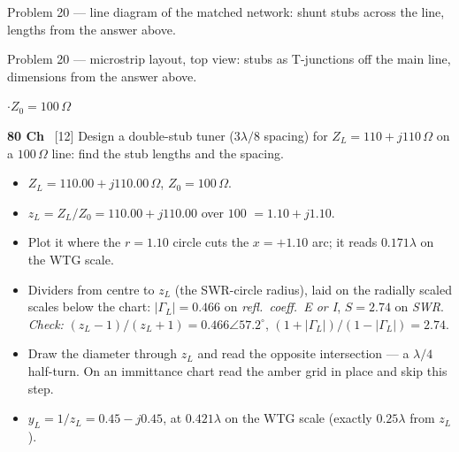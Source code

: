 {\footnotesize\color{sub} Problem 20 --- line diagram of the matched network: shunt stubs across the line, lengths from the answer above.}

{\footnotesize\color{sub} Problem 20 --- microstrip layout, top view: stubs as T-junctions off the main line, dimensions from the answer above.}

\vspace{2pt}

{\color{sub}\footnotesize {} \gap$\cdot$\gap $Z_0 = 100\,\Omega$}

\begin{asked}{\textbf{80 Ch} \ [12]}
Design a double-stub tuner ($3\lambda/8$ spacing) for $Z_L = 110+j110\,\Omega$ on a $100\,\Omega$ line: find the stub lengths and the spacing.
\end{asked}
\begin{itemize}
  \item $Z_L = 110.00 + j110.00\,\Omega$, $Z_0 = 100\,\Omega$.
\end{itemize}
\begin{itemize}
  \item $z_L = Z_L/Z_0 = 110.00 + j110.00$ over $100$ $=1.10 + j1.10$.
  \item Plot it where the $r = 1.10$ circle cuts the $x = +1.10$ arc; it reads $0.171\lambda$ on the WTG scale.
  \item Dividers from centre to $z_L$ (the SWR-circle radius), laid on the radially scaled scales below the chart: $|\Gamma_L| = 0.466$ on \emph{refl.\ coeff.\ E or I}, $S = 2.74$ on \emph{SWR}. \textit{Check:} $(z_L-1)/(z_L+1) = 0.466\angle 57.2^\circ$, $(1+|\Gamma_L|)/(1-|\Gamma_L|) = 2.74$.
\end{itemize}
\begin{itemize}
  \item Draw the diameter through $z_L$ and read the opposite intersection --- a $\lambda/4$ half-turn. On an immittance chart read the amber grid in place and skip this step.
  \item $y_L = 1/z_L = 0.45 - j0.45$, at $0.421\lambda$ on the WTG scale (exactly $0.25\lambda$ from $z_L$).
\end{itemize}
